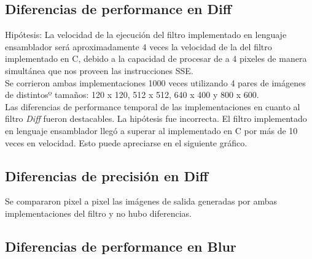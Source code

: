 \documentclass[10pt,a4paper,spanish]{article}
\begin{document}
\subsection{Diferencias de performance en Diff}

Hipótesis: La velocidad de la ejecución del filtro implementado en lenguaje ensamblador será aproximadamente 4 veces la velocidad de la del filtro implementado en C, debido a la capacidad de procesar de a 4 pixeles de manera simultánea que nos proveen las instrucciones SSE. \\

Se corrieron ambas implementaciones 1000 veces utilizando 4 pares de imágenes de distintosº tamaños: 120 x 120, 512 x 512, 640 x 400 y 800 x 600. \\

Las diferencias de performance temporal de las implementaciones en cuanto al filtro \textit{Diff} fueron destacables. La hipótesis fue incorrecta. El filtro implementado en lenguaje ensamblador llegó a superar al implementado en C por más de 10 veces en velocidad. Esto puede apreciarse en el siguiente gráfico. \\


\subsection{Diferencias de precisión en Diff}

Se compararon pixel a pixel las imágenes de salida generadas por ambas implementaciones del filtro y no hubo diferencias.

\subsection{Diferencias de performance en Blur}
\end{document}
